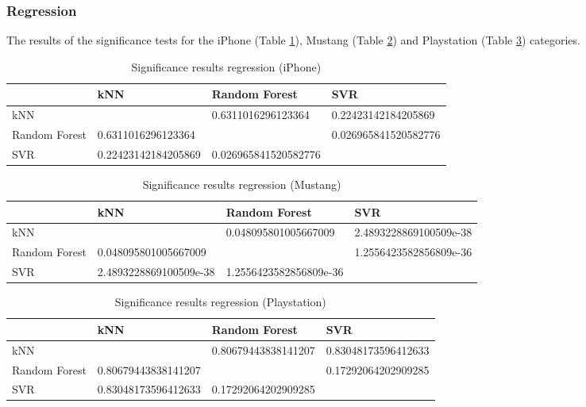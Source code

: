 \subsubsection{Regression}
The results of the significance tests for the iPhone (Table \ref{tab_sig_reg_iphone}), Mustang (Table \ref{tab_sig_reg_mustang}) and Playstation (Table \ref{tab_sig_reg_playstation}) categories.
\begin{table}[h]
	\begin{center}
	\begin{tabular}{| p{3.25cm} || p{3.25cm} | p{3.25cm} | p{3.25cm} |}
		\hline
		& kNN & Random Forest & SVR \\
		\hline \hline
		kNN & & 0.6311016296123364 & 0.22423142184205869 \\
		\hline
		Random Forest & 0.6311016296123364 & & 0.026965841520582776 \\
		\hline
		SVR & 0.22423142184205869 & 0.026965841520582776 & \\
		\hline
	\end{tabular}
	\end{center}
	\caption{Significance results regression (iPhone)}
	\label{tab_sig_reg_iphone}
\end{table}
\begin{table}[h]
	\begin{center}
	\begin{tabular}{| p{3.25cm} || p{3.25cm} | p{3.25cm} | p{3.25cm} |}
		\hline
		& kNN & Random Forest & SVR \\
		\hline \hline
		kNN & & 0.048095801005667009 & 2.4893228869100509e-38 \\
		\hline
		Random Forest & 0.048095801005667009 & & 1.2556423582856809e-36 \\
		\hline
		SVR & 2.4893228869100509e-38 & 1.2556423582856809e-36 & \\
		\hline
	\end{tabular}
	\end{center}
	\caption{Significance results regression (Mustang)}
	\label{tab_sig_reg_mustang}
\end{table}
\begin{table}[h]
	\begin{center}
	\begin{tabular}{| p{3.25cm} || p{3.25cm} | p{3.25cm} | p{3.25cm} |}
		\hline
		& kNN & Random Forest & SVR \\
		\hline \hline
		kNN & & 0.80679443838141207 & 0.83048173596412633 \\
		\hline
		Random Forest & 0.80679443838141207 & & 0.17292064202909285 \\
		\hline
		SVR & 0.83048173596412633 & 0.17292064202909285 & \\
		\hline
	\end{tabular}
	\end{center}
	\caption{Significance results regression (Playstation)}
	\label{tab_sig_reg_playstation}
\end{table}

